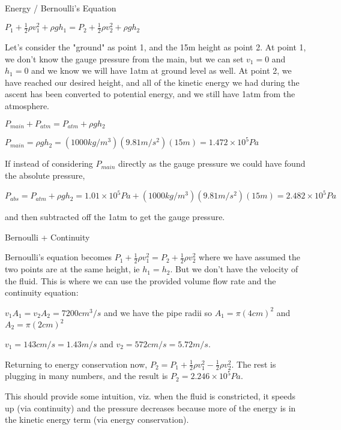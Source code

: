 \documentclass[10pt]{article}
\newenvironment{problem}[2][Problem]{\begin{trivlist}
\item[\hskip \labelsep {\bfseries #1}\hskip \labelsep {\bfseries #2.}]}{\end{trivlist}}
\begin{document}
\begin{problem}{4} Energy / Bernoulli's Equation\\
\item 
$P_1 + \frac{1}{2}\rho v_1^2 + \rho g h_1 = P_2 + \frac{1}{2}\rho v_2^2 + \rho g h_2$
\item Let's consider the "ground" as point 1, and the 15m height as point 2. At point 1, we don't know the gauge pressure from the main, but we can set $v_1 = 0$ and $h_1=0$ and we know we will have 1atm at ground level as well. At point 2, we have reached our desired height, and all of the kinetic energy we had during the ascent has been converted to potential energy, and we still have 1atm from the atmosphere.
\item $P_{main} + P_{atm}= P_{atm} + \rho g h_2$
\item $P_{main} = \rho g h_2 = (1000kg/m^3)(9.81m/s^2)(15m) = 1.472\times 10^5Pa$

\item 
If instead of considering $P_{main}$ directly as the gauge pressure we could have found the absolute pressure,
\item $P_{abs}= P_{atm} + \rho g h_2 = 1.01\times 10^5Pa + (1000kg/m^3)(9.81m/s^2)(15m)=2.482\times 10^5Pa$
\item and then subtracted off the 1atm to get the gauge pressure.

\end{problem}

\begin{problem}{5} Bernoulli + Continuity\\
\item Bernoulli's equation becomes $P_1 + \frac{1}{2}\rho v_1^2 = P_2 + \frac{1}{2}\rho v_2^2$ where we have assumed the two points are at the same height, ie $h_1 = h_2$. But we don't have the velocity of the fluid. This is where we can use the provided volume flow rate and the continuity equation:
\item $v_1A_1 = v_2A_2 = 7200cm^3/s$ and we have the pipe radii so $A_1 = \pi (4cm)^2$ and $A_2 = \pi (2cm)^2$
\item $v_1 = 143cm/s = 1.43m/s$ and $v_2 = 572 cm/s = 5.72m/s $.
\item Returning to energy conservation now, $P_2 = P_1 + \frac{1}{2}\rho v_1^2 - \frac{1}{2}\rho v_2^2$. The rest is plugging in many numbers, and the result is $P_2 = 2.246 \times 10^5 Pa$.

This should provide some intuition, viz. when the fluid is constricted, it speeds up (via continuity) and the pressure decreases because more of the energy is in the kinetic energy term (via energy conservation).
\end{problem}


\end{document}
